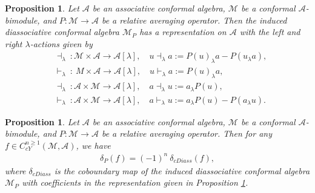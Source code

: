 \documentclass[a4paper,reqno,10pt]{amsart}
\theoremstyle{plain}
\newtheorem{proposition}[thm]{Proposition}
\theoremstyle{definition}
\theoremstyle{remark}
\newcommand{\M}{\mathcal{M}}
\newcommand{\la}{\lambda}
\begin{document}
\begin{proposition}\label{ind-rep}
Let $\mathcal{A}$ be an associative conformal algebra, $\M$ be a conformal $\mathcal{A}$-bimodule, and $P: \M \to \mathcal{A}$ be a relative averaging operator. Then the induced diassociative conformal algebra $\M_P$ has a representation on $\mathcal{A}$ with the left and right $\la$-actions given by
    \begin{align*}
        &\dashv_{\la} ~ \! : \M \times \mathcal{A} \to \mathcal{A}[\la], \quad u \dashv_{\la} a := P(u)_{\la}a - P(u_{\la} a),\\
       & \vdash_{\la} ~ \!:\ M \times \mathcal{A} \to \mathcal{A}[\la], \quad u \vdash_{\la} a := P(u)_{\la}a, \\
        &\dashv_{\la} ~ \! : \mathcal{A} \times  \M \to \mathcal{A}[\la], \quad a \dashv_{\la} u := a_{\la} P(u),\\ 
        &\vdash_{\la} ~ \! :\mathcal{A} \times  \M \to \mathcal{A} [\la], \quad a \vdash_{\la} u := a_{\la} P(u) - P(a_{\la} u).
    \end{align*}
\end{proposition}

\begin{proposition}\label{two-coboundary}
    Let $\mathcal{A}$ be an associative conformal algebra, $\M$ be a conformal $\mathcal{A}$-bimodule, and $P: \M \to \mathcal{A}$ be a relative averaging operator. Then for any $f \in C_{cY}^{n \geq 1} (\M, \mathcal{A})$, we have
    \begin{align*}
        \delta_P (f) = (-1)^n ~ \! \delta_{cDiass} (f),
    \end{align*}
    where $\delta_{cDiass}$ is the coboundary map of the induced diassociative conformal algebra $\M_P$ with coefficients in the representation given in Proposition \ref{ind-rep}.
\end{proposition}
\end{document}
